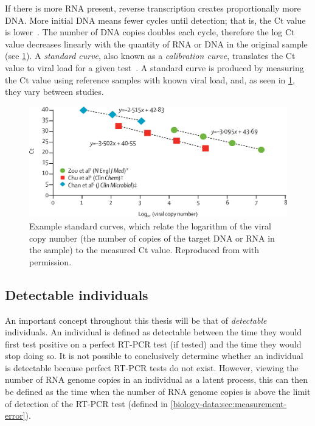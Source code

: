 \documentclass[thesis.tex]{subfiles}
\begin{document}
If there is more RNA present, reverse transcription creates proportionally more DNA.
More initial DNA means fewer cycles until detection; that is, the Ct value is lower~\autocite{hanRTPCR}.
The number of DNA copies doubles each cycle, therefore the log Ct value decreases linearly with the quantity of RNA or DNA in the original sample (see \cref{biology-data:fig:ct-calibration}).
A \emph{standard curve}, also known as a \emph{calibration curve}, translates the Ct value to viral load for a given test~\autocite{bustinMIQE}.
A standard curve is produced by measuring the Ct value using reference samples with known viral load, and, as seen in \cref{biology-data:fig:ct-calibration}, they vary between studies.
\begin{figure}
    \centering
    \includegraphics[width=\textwidth]{biology-data/ct-calibration}
    \caption[Example standard Ct curves]{%
        Example standard curves, which relate the logarithm of the viral copy number (the number of copies of the target DNA or RNA in the sample) to the measured Ct value.
        Reproduced from \textcite{hanRTPCR} with permission.
    }
    \label{biology-data:fig:ct-calibration}
\end{figure}

\subsection{Detectable individuals} \label{biology-data:sec:detectable}

An important concept throughout this thesis will be that of \emph{detectable} individuals.
An individual is defined as detectable between the time they would first test positive on a perfect RT-PCR test (if tested) and the time they would stop doing so.
It is not possible to conclusively determine whether an individual is detectable because perfect RT-PCR tests do not exist.
However, viewing the number of RNA genome copies in an individual as a latent process, this can then be defined as the time when the number of RNA genome copies is above the limit of detection of the RT-PCR test (defined in \cref{biology-data:sec:measurement-error}).
\end{document}
